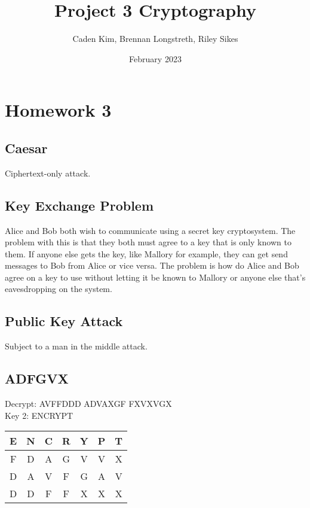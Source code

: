 \documentclass{article}
\title{Project 3 Cryptography}
\author{Caden Kim, Brennan Longstreth, Riley Sikes }
\date{February 2023}
\begin{document}
\maketitle

\section{Homework 3}

\subsection{Caesar}

Ciphertext-only attack.

\subsection{Key Exchange Problem}

Alice and Bob both wish to communicate using a secret key cryptosystem. The problem with this is that they both must agree to a key that is only known to them. If anyone else gets the key, like Mallory for example, they can get send messages to Bob from Alice or vice versa. The problem is how do Alice and Bob agree on a key to use without letting it be known to Mallory or anyone else that's eavesdropping on the system.

\subsection{Public Key Attack}

Subject to a man in the middle attack.

\subsection{ADFGVX}
Decrypt: AVFFDDD ADVAXGF FXVXVGX \\

Key 2: ENCRYPT \\
\begin{center}
\begin{tabular}{ c c c c c c c }
    E & N & C & R & Y & P & T \\ [0.5ex] 
    \hline
    F & D & A & G & V & V & X \\
    D & A & V & F & G & A & V \\
    D & D & F & F & X & X & X \\
\end{tabular}
\end{center}
\end{document}
